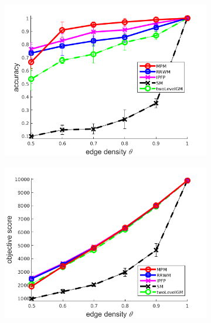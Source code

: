 \begin{figure}
		\begin{subfigure}[b]{0.33\textwidth}
			\centering
			\includegraphics[scale=0.25]{"chapter3/fig/SyntheticTest/no_descr/Results_v4.3.3/Test4/accuracy_avg10t"} 
		\end{subfigure}%
		\begin{subfigure}[b]{0.33\textwidth}
			\centering
			\includegraphics[scale=0.25]{"chapter3/fig/SyntheticTest/no_descr/Results_v4.3.3/Test4/score_avg10t"} 
		\end{subfigure} 
		\begin{subfigure}[b]{0.33\textwidth}
			\centering

\end{subfigure}
\end{figure}
